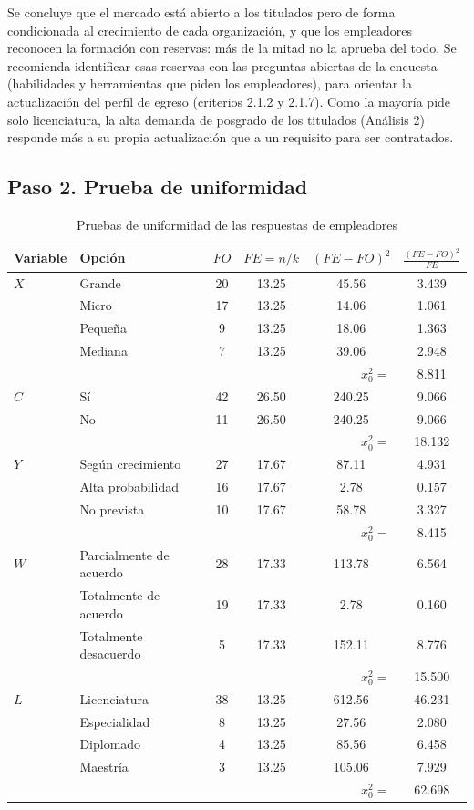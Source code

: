 \documentclass[12pt, a4paper]{article}
\newenvironment{mitabla}[2][H]{%
  \begin{table}[#1]
  \centering
  \caption{#2}
  \small
}{%
  \end{table}
}
\begin{document}
Se concluye que el mercado está abierto a los titulados pero de forma
condicionada al crecimiento de cada organización, y que los empleadores
reconocen la formación con reservas: más de la mitad no la aprueba del
todo. Se recomienda identificar esas reservas con las preguntas abiertas
de la encuesta (habilidades y herramientas que piden los empleadores),
para orientar la actualización del perfil de egreso (criterios 2.1.2 y
2.1.7). Como la mayoría pide solo licenciatura, la alta demanda de
posgrado de los titulados (Análisis 2) responde más a su propia
actualización que a un requisito para ser contratados.

\subsection{Paso 2. Prueba de uniformidad}

\begin{mitabla}{Pruebas de uniformidad de las respuestas de empleadores}\label{tab:a5-unif}
\begin{tabular}{llcccc}
\toprule
\textbf{Variable} & \textbf{Opción} & \textbf{$FO$} & \textbf{$FE = n/k$} & \textbf{$(FE-FO)^2$} & \textbf{$\frac{(FE-FO)^2}{FE}$} \\
\midrule
$X$ & Grande & 20 & 13.25 & 45.56 & 3.439 \\
 & Micro & 17 & 13.25 & 14.06 & 1.061 \\
 & Pequeña & 9 & 13.25 & 18.06 & 1.363 \\
 & Mediana & 7 & 13.25 & 39.06 & 2.948 \\
 & \multicolumn{4}{r}{$x_0^2 =$} & 8.811 \\
\midrule
$C$ & Sí & 42 & 26.50 & 240.25 & 9.066 \\
 & No & 11 & 26.50 & 240.25 & 9.066 \\
 & \multicolumn{4}{r}{$x_0^2 =$} & 18.132 \\
\midrule
$Y$ & Según crecimiento & 27 & 17.67 & 87.11 & 4.931 \\
 & Alta probabilidad & 16 & 17.67 & 2.78 & 0.157 \\
 & No prevista & 10 & 17.67 & 58.78 & 3.327 \\
 & \multicolumn{4}{r}{$x_0^2 =$} & 8.415 \\
\midrule
$W$ & Parcialmente de acuerdo & 28 & 17.33 & 113.78 & 6.564 \\
 & Totalmente de acuerdo & 19 & 17.33 & 2.78 & 0.160 \\
 & Totalmente desacuerdo & 5 & 17.33 & 152.11 & 8.776 \\
 & \multicolumn{4}{r}{$x_0^2 =$} & 15.500 \\
\midrule
$L$ & Licenciatura & 38 & 13.25 & 612.56 & 46.231 \\
 & Especialidad & 8 & 13.25 & 27.56 & 2.080 \\
 & Diplomado & 4 & 13.25 & 85.56 & 6.458 \\
 & Maestría & 3 & 13.25 & 105.06 & 7.929 \\
 & \multicolumn{4}{r}{$x_0^2 =$} & 62.698 \\
\bottomrule
\end{tabular}
\end{mitabla}
\end{document}
